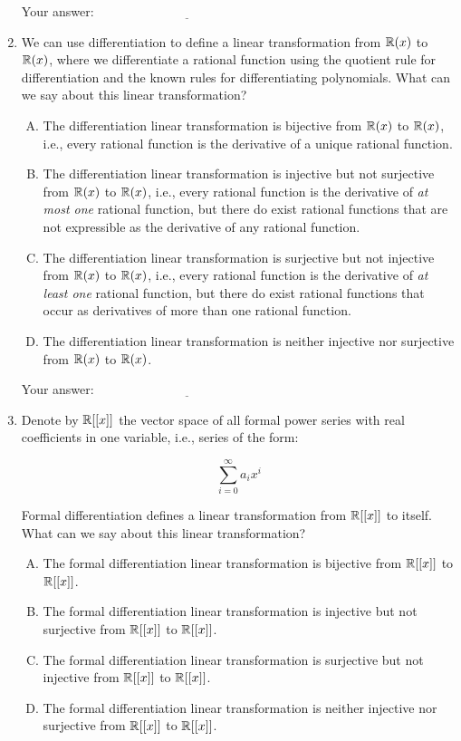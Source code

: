 \documentclass[10pt]{amsart}
\begin{document}
\begin{enumerate}
  \vspace{0.1in}
  Your answer: $\underline{\qquad\qquad\qquad\qquad\qquad\qquad\qquad}$
  \vspace{0.1in}

\item We can use differentiation to define a linear transformation
  from $\mathbb{R}(x)$ to $\mathbb{R}(x)$, where we differentiate a rational function
  using the quotient rule for differentiation and the known rules for
  differentiating polynomials. What can we say about this linear
  transformation?

  \begin{enumerate}[(A)]
  \item The differentiation linear transformation is bijective from
    $\mathbb{R}(x)$ to $\mathbb{R}(x)$, i.e., every rational function is the
    derivative of a unique rational function.
  \item The differentiation linear transformation is injective but not
    surjective from $\mathbb{R}(x)$ to $\mathbb{R}(x)$, i.e., every rational function
    is the derivative of {\em at most one} rational function, but
    there do exist rational functions that are not expressible as the
    derivative of any rational function.
  \item The differentiation linear transformation is surjective but
    not injective from $\mathbb{R}(x)$ to $\mathbb{R}(x)$, i.e., every rational
    function is the derivative of {\em at least one} rational
    function, but there do exist rational functions that occur as
    derivatives of more than one rational function.
  \item The differentiation linear transformation is neither injective
    nor surjective from $\mathbb{R}(x)$ to $\mathbb{R}(x)$.
  \end{enumerate}

  \vspace{0.1in}
  Your answer: $\underline{\qquad\qquad\qquad\qquad\qquad\qquad\qquad}$
  \vspace{0.1in}

\item Denote by $\mathbb{R}[[x]]$ the vector space of all formal power series
  with real coefficients in one variable, i.e., series of the form:

  $$\sum_{i=0}^\infty a_ix^i$$

  Formal differentiation defines a linear transformation from
  $\mathbb{R}[[x]]$ to itself. What can we say about this linear transformation?

  \begin{enumerate}[(A)]
  \item The formal differentiation linear transformation is bijective
    from $\mathbb{R}[[x]]$ to $\mathbb{R}[[x]]$.
  \item The formal differentiation linear transformation is injective
    but not surjective from $\mathbb{R}[[x]]$ to $\mathbb{R}[[x]]$.
  \item The formal differentiation linear transformation is surjective but
    not injective from $\mathbb{R}[[x]]$ to $\mathbb{R}[[x]]$.
  \item The formal differentiation linear transformation is neither
    injective nor surjective from $\mathbb{R}[[x]]$ to $\mathbb{R}[[x]]$.
  \end{enumerate}


\end{enumerate}
\end{document}
